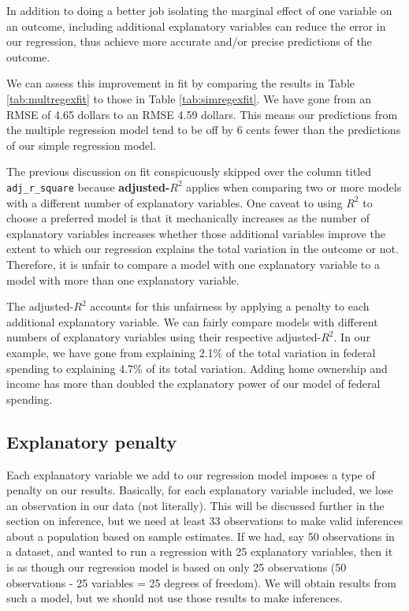 \documentclass[
]{book}
\begin{document}
In addition to doing a better job isolating the marginal effect of one variable on an outcome, including additional explanatory variables can reduce the error in our regression, thus achieve more accurate and/or precise predictions of the outcome.

We can assess this improvement in fit by comparing the results in Table \ref{tab:multregexfit} to those in Table \ref{tab:simregexfit}. We have gone from an RMSE of 4.65 dollars to an RMSE 4.59 dollars. This means our predictions from the multiple regression model tend to be off by 6 cents fewer than the predictions of our simple regression model.

The previous discussion on fit conspicuously skipped over the column titled \texttt{adj\_r\_square} because \textbf{adjusted-\(R^2\)} applies when comparing two or more models with a different number of explanatory variables. One caveat to using \(R^2\) to choose a preferred model is that it mechanically increases as the number of explanatory variables increases whether those additional variables improve the extent to which our regression explains the total variation in the outcome or not. Therefore, it is unfair to compare a model with one explanatory variable to a model with more than one explanatory variable.

The adjusted-\(R^2\) accounts for this unfairness by applying a penalty to each additional explanatory variable. We can fairly compare models with different numbers of explanatory variables using their respective adjusted-\(R^2\). In our example, we have gone from explaining 2.1\% of the total variation in federal spending to explaining 4.7\% of its total variation. Adding home ownership and income has more than doubled the explanatory power of our model of federal spending.

\hypertarget{explanatory-penalty}{%
\subsection{Explanatory penalty}\label{explanatory-penalty}}

Each explanatory variable we add to our regression model imposes a type of penalty on our results. Basically, for each explanatory variable included, we lose an observation in our data (not literally). This will be discussed further in the section on inference, but we need at least 33 observations to make valid inferences about a population based on sample estimates. If we had, say 50 observations in a dataset, and wanted to run a regression with 25 explanatory variables, then it is as though our regression model is based on only 25 observations (50 observations - 25 variables = 25 degrees of freedom). We will obtain results from such a model, but we should not use those results to make inferences.
\end{document}

